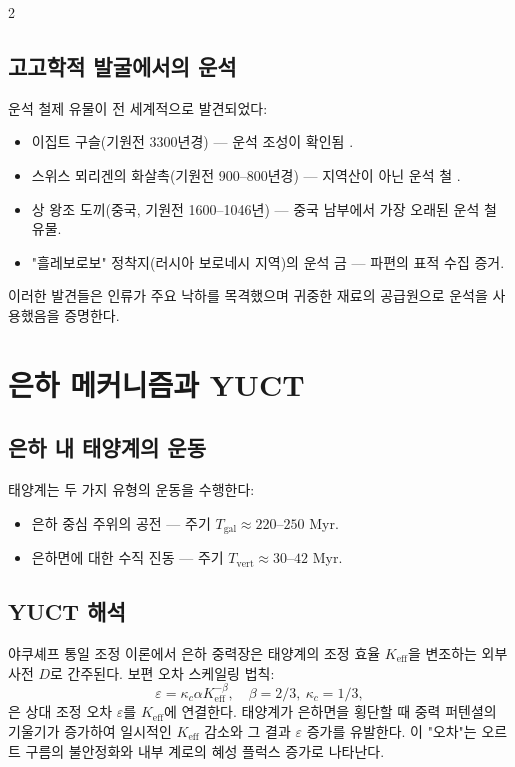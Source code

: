 \documentclass[12pt,a4paper]{article}
\begin{document}
\begin{multicols}{2}
		\subsection{고고학적 발굴에서의 운석}
		운석 철제 유물이 전 세계적으로 발견되었다:
		\begin{itemize}
			\item 이집트 구슬(기원전 3300년경) — 운석 조성이 확인됨 \cite{Rehren2013}.
			\item 스위스 뫼리겐의 화살촉(기원전 900–800년경) — 지역산이 아닌 운석 철 \cite{Hofmann2023}.
			\item 상 왕조 도끼(중국, 기원전 1600–1046년) — 중국 남부에서 가장 오래된 운석 철 유물.
			\item "흘레보로보" 정착지(러시아 보로네시 지역)의 운석 금 — 파편의 표적 수집 증거.
		\end{itemize}
		이러한 발견들은 인류가 주요 낙하를 목격했으며 귀중한 재료의 공급원으로 운석을 사용했음을 증명한다.
		
		\section{은하 메커니즘과 YUCT}
		\subsection{은하 내 태양계의 운동}
		태양계는 두 가지 유형의 운동을 수행한다:
		\begin{itemize}
			\item 은하 중심 주위의 공전 — 주기 \(T_{\text{gal}} \approx 220\)–\(250\) Myr.
			\item 은하면에 대한 수직 진동 — 주기 \(T_{\text{vert}} \approx 30\)–\(42\) Myr.
		\end{itemize}
		
		\subsection{YUCT 해석}
		야쿠셰프 통일 조정 이론에서 은하 중력장은 태양계의 조정 효율 \(K_{\mathrm{eff}}\)을 변조하는 외부 사전 \(D\)로 간주된다. 보편 오차 스케일링 법칙:
		\[
		\varepsilon = \kappa_c \alpha K_{\mathrm{eff}}^{-\beta},\quad \beta = 2/3,\ \kappa_c = 1/3,
		\]
		은 상대 조정 오차 \(\varepsilon\)를 \(K_{\mathrm{eff}}\)에 연결한다. 태양계가 은하면을 횡단할 때 중력 퍼텐셜의 기울기가 증가하여 일시적인 \(K_{\mathrm{eff}}\) 감소와 그 결과 \(\varepsilon\) 증가를 유발한다. 이 "오차"는 오르트 구름의 불안정화와 내부 계로의 혜성 플럭스 증가로 나타난다.
		

\end{multicols}
\end{document}
